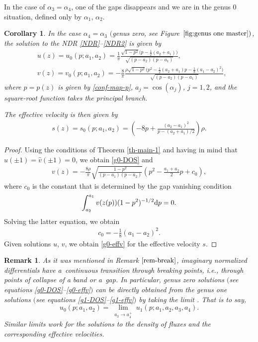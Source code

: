 \documentclass[10pt,a4paper]{amsart}
\numberwithin{equation}{section}
\newtheorem{Corollary}[Theorem]{Corollary}
\newtheorem{Remark}[Theorem]{Remark}
\def\ra{\rightarrow}
\def\a{\alpha}
\begin{document}
In the case of $\a_3=\a_4$, one of the gaps disappears and we are in the genus 0 situation, defined only by $\a_1$, $\a_2$.

\begin{Corollary}\label{g0-master case}
In the case $\alpha_4=\alpha_3$ $($genus zero, see Figure~$\ref{fig:genus one master})$, the solution to the NDR \eqref{NDR}--\eqref{NDR2} is given by
\begin{align}
&u(z)=u_0(p;a_1,a_2)=\frac{1}{\pi}\frac{\sqrt{1-p^2}\bigl(p-\frac{1}{2}(a_2+a_1)\bigr)}{\sqrt{(p-a_2)(p-a_1)}},\label{g0-DOS}\\
&v(z)=v_0(p;a_1,a_2)=-\frac{8}{\pi}\frac{\rho\sqrt{1-p^2}\bigl(p^2-\frac{1}{2}(a_2+a_1)p-\frac{1}{8}(a_1-a_2)^2\bigr)}{\sqrt{(p-a_2)(p-a_1)}},\label{g0-DOS-v}
\end{align}
where $p=p(z)$ is given by \eqref{conf-map-p},
%
$a_j=\cos(\alpha_j)$, $j=1,2$, and the square-root function takes the principal branch.

The effective velocity is then given by
\begin{align}
s(z)=s_0(p;a_1,a_2)=\left(-8p+\frac{(a_2-a_1)^2}{p-(a_2+a_1)/2}\right)\rho.\label{g0-effv}
\end{align}
\end{Corollary}

\begin{proof}
Using the conditions of Theorem \ref{th-main-1} and having in mind that $\hat u(\pm 1)= \hat v(\pm 1)=0$, we obtain \eqref{g0-DOS} and
\begin{align*}
v(z)=-\frac{8\rho}{\pi}\sqrt{\frac{1-p^2}{(p-a_1)(p-a_2)}}\left(p^2-\frac{a_1+a_2}{2}p+c_0\right),
\end{align*}
where $c_0$ is the constant that is determined by the gap vanishing condition
\begin{align*}
\int_{a_2}^{a_1}v(z(p))(1-p^2)^{-1/2}{\rm d}p=0.
\end{align*}
Solving the latter equation, we obtain
\begin{align*}
c_0=-\frac{1}{8}(a_1-a_2)^2.
\end{align*}
Given solutions $u$, $v$, we obtain \eqref{g0-effv} for the effective velocity $s$.
\end{proof}

\begin{Remark}
As it was mentioned in Remark $\ref{rem-break}$, imaginary normalized differentials have a~continuous transition through breaking points, i.e., through points of collapse of a band or a~gap. In particular,
genus zero solutions $($see equations \eqref{g0-DOS}--\eqref{g0-effv}$)$ can be directly obtained from the genus one solutions $($see equations \eqref{g1-DOS}--\eqref{g1-effv}$)$ by taking the limit \smash{$a_3\ra a_4^+$}. That is to say,
\[u_0(p;a_1,a_2)=\lim_{\substack{a_3\ra a_4^+}}u_1(p;a_1,a_2,a_3,a_4).\]
Similar limits work for the solutions to the density of fluxes and the corresponding effective velocities.
\end{Remark}
\end{document}
